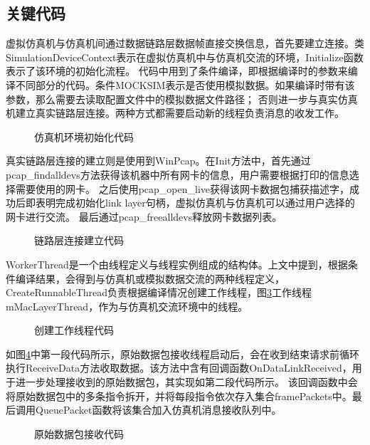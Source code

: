 \subsection{关键代码}
虚拟仿真机与仿真机间通过数据链路层数据帧直接交换信息，首先要建立连接。类SimulationDeviceContext表示在虚拟仿真机中与仿真机交流的环境，Initialize函数表示了该环境的初始化流程。
代码中用到了条件编译，即根据编译时的参数来编译不同部分的代码。条件MOCKSIM表示是否使用模拟数据。如果编译时带有该参数，那么需要去读取配置文件中的模拟数据文件路径；
否则进一步与真实仿真机建立真实链路层连接。两种方式都需要启动新的线程负责消息的收发工作。
\begin{figure}[h!]
    \centering
     
    \caption{仿真机环境初始化代码}
    \label{code1}
\end{figure}

\par
真实链路层连接的建立则是使用到WinPcap。在Init方法中，首先通过pcap\_findalldevs方法获得该机器中所有网卡的信息，用户需要根据打印的信息选择需要使用的网卡。
之后使用pcap\_open\_live获得该网卡数据包捕获描述字，成功后即表明完成初始化link layer句柄，虚拟仿真机与仿真机可以通过用户选择的网卡进行交流。
最后通过pcap\_freealldevs释放网卡数据列表。

\begin{figure}[h!]
    \centering
     
    \caption{链路层连接建立代码}
    \label{code2}
\end{figure}

\par
WorkerThread是一个由线程定义与线程实例组成的结构体。上文中提到，根据条件编译结果，会得到与仿真机或模拟数据交流的两种线程定义，
CreateRunnableThread负责根据编译情况创建工作线程，图\ref{code3}工作线程mMacLayerThread，作为与仿真机交流环境中的线程。
\begin{figure}[h!]
    \centering
     
    \caption{创建工作线程代码}
    \label{code3}
\end{figure}

\par
如图\ref{code4}中第一段代码所示，原始数据包接收线程启动后，会在收到结束请求前循环执行ReceiveData方法收取数据。该方法中含有回调函数OnDataLinkReceived，用于进一步处理接收到的原始数据包，其实现如第二段代码所示。
该回调函数中会将原始数据包中的多条指令拆开，并将每段指令依次存入集合framePackets中。最后调用QueuePacket函数将该集合加入仿真机消息接收队列中。
\begin{figure}[h!]
    \centering
     
    \caption{原始数据包接收代码}
    \label{code4}
\end{figure}

